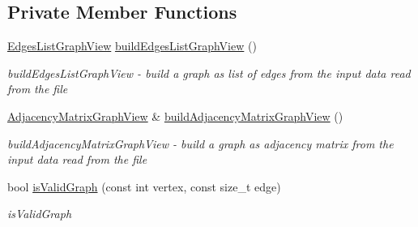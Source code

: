 \subsection*{Private Member Functions}
\begin{DoxyCompactItemize}
\item 
\hyperlink{a00037_aa7134896d837083f384364b56a32bb49_aa7134896d837083f384364b56a32bb49}{Edges\+List\+Graph\+View} \hyperlink{a00007_a389733fa38c215c3130be5ad97a60243_a389733fa38c215c3130be5ad97a60243}{build\+Edges\+List\+Graph\+View} ()
\begin{DoxyCompactList}\small\item\em build\+Edges\+List\+Graph\+View -\/ build a graph as list of edges from the input data read from the file \end{DoxyCompactList}\item 
\hyperlink{a00037_af657481a4b0a05546de6e9c1023bd9f5_af657481a4b0a05546de6e9c1023bd9f5}{Adjacency\+Matrix\+Graph\+View} \& \hyperlink{a00007_a8e00e4f2ef074a816e3c530fda55cca1_a8e00e4f2ef074a816e3c530fda55cca1}{build\+Adjacency\+Matrix\+Graph\+View} ()
\begin{DoxyCompactList}\small\item\em build\+Adjacency\+Matrix\+Graph\+View -\/ build a graph as adjacency matrix from the input data read from the file \end{DoxyCompactList}\item 
bool \hyperlink{a00007_ad40e02849e59b544cf33fe279f325e5f_ad40e02849e59b544cf33fe279f325e5f}{is\+Valid\+Graph} (const int vertex, const size\+\_\+t edge)
\begin{DoxyCompactList}\small\item\em is\+Valid\+Graph \end{DoxyCompactList}\end{DoxyCompactItemize}
